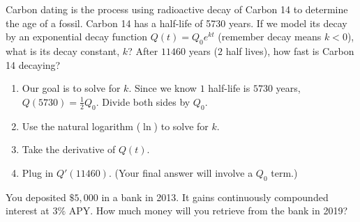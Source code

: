 \documentclass[12pt, a4paper]{article}
\begin{document}
\vspace{-0.5in}
\begin{ex}
  Carbon dating is the process using radioactive decay of Carbon 14 to
  determine the age of a fossil. Carbon 14 has a half-life of 5730
  years. If we model its decay by an exponential decay function \(Q(t)
  = Q_0 e^{kt}\) (remember decay means \(k < 0\)), what is its decay constant, \(k\)? After \(11460\)
  years (\(2\) half lives), how fast is Carbon 14 decaying?
  \begin{enumerate}
  \item Our goal is to solve for \(k\). Since we know \(1\) half-life
    is \(5730\) years, \(Q(5730) =
    \frac{1}{2}Q_0\). Divide both sides by \(Q_0\).
    \vspace{0.75in}
  \item Use the natural logarithm (\(\ln\)) to solve for \(k\).
    \vspace{0.75in}
  \item Take the derivative of \(Q(t)\).
    \vspace{0.75in}
  \item Plug in \(Q'(11460)\). (Your final answer will involve a
    \(Q_0\) term.)
  \end{enumerate}
\end{ex}
\vspace{-2in}
\begin{ex}
  You deposited $\$5{,}000$ in a bank in 2013.  It gains continuously compounded interest at $3\%$ APY.  How much money will you retrieve from the bank in 2019?
\end{ex}
\end{document}
